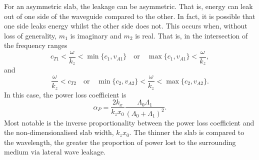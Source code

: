 	For an asymmetric slab, the leakage can be asymmetric. That is, energy can leak out of one side of the waveguide compared to the other. In fact, it is possible that one side leaks energy whilst the other side does not. This occurs when, without loss of generality, $m_1$ is imaginary and $m_2$ is real. That is, in the intersection of the frequency ranges
	\begin{equation}
	c_{T1} < \frac{\omega}{k_z} < \min\{c_1, v_{A1}\} \quad \text{or} \quad \max\{c_1, v_{A1}\} < \frac{\omega}{k_z},
	\end{equation}
	and
	\begin{equation}
	\frac{\omega}{k_z} < c_{T2} \quad \text{or} \quad \min\{c_2, v_{A2}\} < \frac{\omega}{k_z} < \max\{c_2, v_{A2}\}.
	\end{equation}
	In this case, the power loss coefficient is 
	\begin{equation}
	\alpha_P = \frac{2k_x}{k_zx_0}\frac{\Lambda_0\Lambda_1}{(\Lambda_0 + \Lambda_1)^2}.
	\end{equation}
	Most notable is the inverse proportionality between the power loss coefficient and the non-dimensionalised slab width, $k_z x_0$. The thinner the slab is compared to the wavelength, the greater the proportion of power lost to the surrounding medium via lateral wave leakage.
